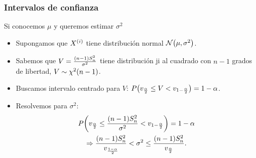 \documentclass[table]{beamer}
\begin{document}
\begin{frame}
    \frametitle{Intervalos de confianza}
    \begin{block}{Si conocemos $\mu$ y queremos estimar $\sigma^{2}$}
        \begin{itemize}
            \item Supongamos que $X^{\parens{i}}$ tiene distribución normal $\normal{\mu}{\sigma^{2}}$.
            \item Sabemos que $V =  \frac{\parens{n - 1} S^{2}_{n}}{\sigma^{2}}$ tiene distribución ji al cuadrado con $n - 1$ grados de libertad, $V \sim \chidist{n - 1}$.
            \item Buscamos intervalo centrado para $V$: $\prob{v_{\frac{\alpha}{2}} \leq V < v_{1 - \frac{\alpha}{2}}} = 1 - \alpha$.
            \item Resolvemos para $\sigma^{2}$:
                \begin{multline*}
                    \prob{v_{\frac{\alpha}{2}} \leq \frac{\parens{n - 1} S^{2}_{n}}{\sigma^{2}} < v_{1 - \frac{\alpha}{2}}}
                    = 1 - \alpha
                    \\
                    \Rightarrow
                    \frac{\parens{n - 1} S^{2}_{n}}{v_{\frac{1 - \alpha}{2}}} < \sigma^{2} \leq \frac{\parens{n - 1} S^{2}_{n}}{v_{\frac{\alpha}{2}}}
                    .
                \end{multline*}
        \end{itemize}
    \end{block}


\end{frame}
\end{document}
